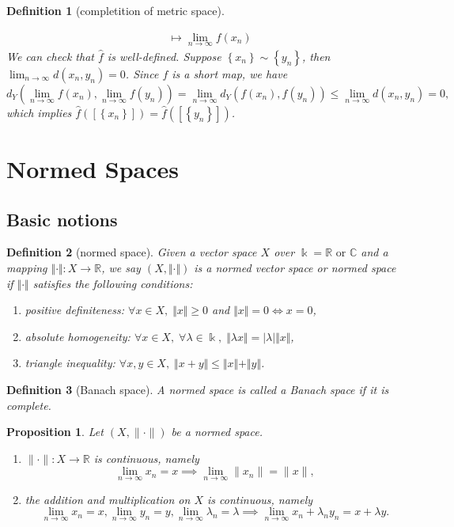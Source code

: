 \documentclass{report}
\newtheorem{definition}{Definition}[section]
\newtheorem{proposition}{Proposition}[section]
\theoremstyle{nonumberplain}
\begin{document}
\begin{definition}[completition of metric space]
\begin{enumerate}[label=(\roman*)]
\begin{align*}
		[\left\{x_n\right\}]&\longmapsto\lim_{n\to\infty}f(x_n)
	\end{align*}
	We can check that $\hat{f}$ is well-defined. Suppose $\left\{x_n\right\}\sim\left\{y_n\right\}$, then $\lim_{n\to\infty}d(x_n,y_n)=0$. Since $f$ is a short map, we have
	\[
		d_Y\left(\lim_{n\to\infty}f(x_n),\lim_{n\to\infty}f(y_n)\right)=\lim_{n\to\infty}d_Y(f(x_n),f(y_n))\le \lim_{n\to\infty}d(x_n,y_n)=0,
	\]
	which implies $\hat{f}\left([\left\{x_n\right\}]\right)=\hat{f}\left([\left\{y_n\right\}]\right)$.
	\end{enumerate}
\end{definition}

\section{Normed Spaces}
\subsection{Basic notions}
\begin{definition}[normed space]
	Given a vector space $X$ over $\Bbbk=\mathbb{R}\text{ or }\mathbb{C}$ and a mapping $\Vert\cdot\Vert : X\to\mathbb{R}$, we say
	$\left(X, \Vert\cdot\Vert\right)$ is a \emph{normed vector space} or \emph{normed space} if $\Vert\cdot\Vert$ satisfies the following conditions:
	\begin{enumerate}
		\item positive definiteness: $\forall x\in X,\;\Vert x\Vert\ge 0$ and $\Vert x\Vert=0\iff x=0$,
		\item absolute homogeneity: $\forall x\in X,\;\forall\lambda\in\Bbbk,\;\Vert \lambda x\Vert=|\lambda| \Vert  x\Vert$,
		\item triangle inequality: $\forall x, y\in X,\;\Vert x+ y\Vert\le\Vert x\Vert+\Vert y\Vert$.
	\end{enumerate}	
\end{definition}

\begin{definition}[Banach space]
	A normed space is called a \emph{Banach space} if it is complete.
\end{definition}

\begin{proposition}
	Let $(X,\|\cdot\|)$ be a normed space.
	\begin{enumerate}
		\item $\|\cdot\|:X\to\mathbb{R}$ is continuous, namely
		\[\lim_{n\to\infty}x_n=x\implies\lim_{n\to\infty}\|x_n\|=\|x\|,\]
		\item the addition and multiplication on $X$ is continuous, namely
		\[
			\lim_{n\to\infty}x_n=x,\lim_{n\to\infty}y_n=y,\lim_{n\to\infty}\lambda_n=\lambda\implies\lim_{n\to\infty}x_n+\lambda_ny_n=x+\lambda y.
		\]
	\end{enumerate}	
\end{proposition}
\end{document}
